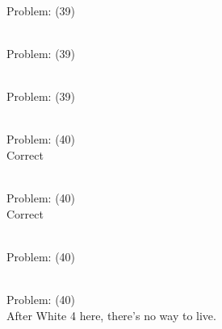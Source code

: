 \documentclass[11pt]{article}
\begin{document}
\begin{minipage}[t]{0.5\textwidth}
  {\centering
  
\\
Problem: (39)\\
  }
\end{minipage}
\begin{minipage}[t]{0.5\textwidth}
  {\centering
  
\\
Problem: (39)\\
  }
\end{minipage}
\begin{minipage}[t]{0.5\textwidth}
  {\centering
  
\\
Problem: (39)\\
  }
\end{minipage}
\begin{minipage}[t]{0.5\textwidth}
  {\centering
  
\\
Problem: (40)\\
Correct\\
  }
\end{minipage}
\begin{minipage}[t]{0.5\textwidth}
  {\centering
  
\\
Problem: (40)\\
Correct\\
  }
\end{minipage}
\begin{minipage}[t]{0.5\textwidth}
  {\centering
  
\\
Problem: (40)\\
  }
\end{minipage}
\begin{minipage}[t]{0.5\textwidth}
  {\centering
  
\\
Problem: (40)\\
After White 4 here, there's no way to live.\\
  }
\end{minipage}
\end{document}
